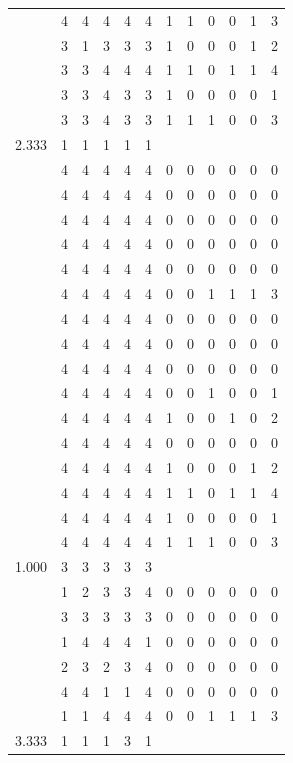 \documentclass[]{book}
\theoremstyle{definition}
\theoremstyle{definition}
\theoremstyle{definition}
\theoremstyle{remark}
\begin{document}
\begin{table}
{\begin{tabular}[t]{rrrrrrrrrrrr}
 & 4 & 4 & 4 & 4 & 4 & 1 & 1 & 0 & 0 & 1 & 3\\
 & 3 & 1 & 3 & 3 & 3 & 1 & 0 & 0 & 0 & 1 & 2\\
 & 3 & 3 & 4 & 4 & 4 & 1 & 1 & 0 & 1 & 1 & 4\\
 & 3 & 3 & 4 & 3 & 3 & 1 & 0 & 0 & 0 & 0 & 1\\
 & 3 & 3 & 4 & 3 & 3 & 1 & 1 & 1 & 0 & 0 & 3\\
2.333 & 1 & 1 & 1 & 1 & 1 &  &  &  &  &  & \\
 & 4 & 4 & 4 & 4 & 4 & 0 & 0 & 0 & 0 & 0 & 0\\
 & 4 & 4 & 4 & 4 & 4 & 0 & 0 & 0 & 0 & 0 & 0\\
 & 4 & 4 & 4 & 4 & 4 & 0 & 0 & 0 & 0 & 0 & 0\\
 & 4 & 4 & 4 & 4 & 4 & 0 & 0 & 0 & 0 & 0 & 0\\
 & 4 & 4 & 4 & 4 & 4 & 0 & 0 & 0 & 0 & 0 & 0\\
 & 4 & 4 & 4 & 4 & 4 & 0 & 0 & 1 & 1 & 1 & 3\\
 & 4 & 4 & 4 & 4 & 4 & 0 & 0 & 0 & 0 & 0 & 0\\
 & 4 & 4 & 4 & 4 & 4 & 0 & 0 & 0 & 0 & 0 & 0\\
 & 4 & 4 & 4 & 4 & 4 & 0 & 0 & 0 & 0 & 0 & 0\\
 & 4 & 4 & 4 & 4 & 4 & 0 & 0 & 1 & 0 & 0 & 1\\
 & 4 & 4 & 4 & 4 & 4 & 1 & 0 & 0 & 1 & 0 & 2\\
 & 4 & 4 & 4 & 4 & 4 & 0 & 0 & 0 & 0 & 0 & 0\\
 & 4 & 4 & 4 & 4 & 4 & 1 & 0 & 0 & 0 & 1 & 2\\
 & 4 & 4 & 4 & 4 & 4 & 1 & 1 & 0 & 1 & 1 & 4\\
 & 4 & 4 & 4 & 4 & 4 & 1 & 0 & 0 & 0 & 0 & 1\\
 & 4 & 4 & 4 & 4 & 4 & 1 & 1 & 1 & 0 & 0 & 3\\
1.000 & 3 & 3 & 3 & 3 & 3 &  &  &  &  &  & \\
 & 1 & 2 & 3 & 3 & 4 & 0 & 0 & 0 & 0 & 0 & 0\\
 & 3 & 3 & 3 & 3 & 3 & 0 & 0 & 0 & 0 & 0 & 0\\
 & 1 & 4 & 4 & 4 & 1 & 0 & 0 & 0 & 0 & 0 & 0\\
 & 2 & 3 & 2 & 3 & 4 & 0 & 0 & 0 & 0 & 0 & 0\\
 & 4 & 4 & 1 & 1 & 4 & 0 & 0 & 0 & 0 & 0 & 0\\
 & 1 & 1 & 4 & 4 & 4 & 0 & 0 & 1 & 1 & 1 & 3\\
3.333 & 1 & 1 & 1 & 3 & 1 &  &  &  &  &  & \\

\end{tabular}}
\end{table}
\end{document}
